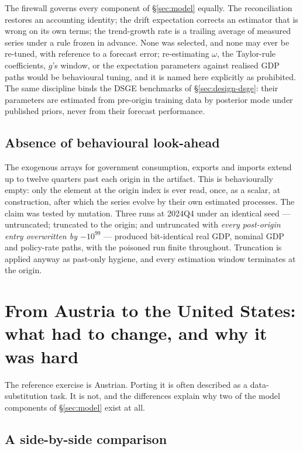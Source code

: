 \documentclass[11pt,a4paper]{article}
\begin{document}
The firewall governs every component of \S\ref{sec:model} equally. The reconciliation restores an
accounting identity; the drift expectation corrects an estimator that is wrong on its own terms;
the trend-growth rate is a trailing average of measured series under a rule frozen in advance.
None was selected, and none may ever be re-tuned, with reference to a forecast error;
re-estimating $\omega$, the Taylor-rule coefficients, $g$'s window, or the expectation parameters
against realised GDP paths would be behavioural tuning, and it is named here explicitly as
prohibited. The same discipline binds the DSGE benchmarks of \S\ref{sec:design-dsge}: their
parameters are estimated from pre-origin training data by posterior mode under published priors,
never from their forecast performance.

\subsection{Absence of behavioural look-ahead}

The exogenous arrays for government consumption, exports and imports extend up to twelve quarters
past each origin in the artifact. This is behaviourally empty: only the element at the origin index
is ever read, once, as a scalar, at construction, after which the series evolve by their own
estimated processes. The claim was tested by mutation. Three runs at 2024Q4 under an identical seed
--- untruncated; truncated to the origin; and untruncated with \emph{every post-origin entry
overwritten by $-10^{99}$} --- produced bit-identical real GDP, nominal GDP and policy-rate paths,
with the poisoned run finite throughout. Truncation is applied anyway as past-only hygiene, and
every estimation window terminates at the origin.

\section{From Austria to the United States: what had to change, and why it was hard}
\label{sec:austria}

The reference exercise is Austrian. Porting it is often described as a data-substitution task. It
is not, and the differences explain why two of the model components of \S\ref{sec:model} exist at
all.

\subsection{A side-by-side comparison}
\end{document}
